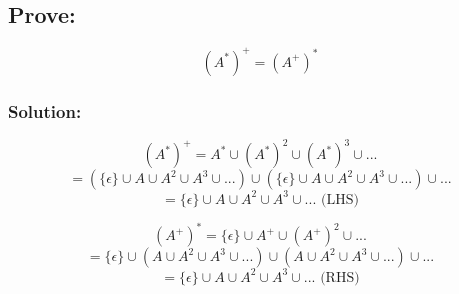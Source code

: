 \documentclass[12pt]{article}
\begin{document}
\subsection*{Prove:} 
\[
(A^*)^+=(A^+)^*
\]
\subsubsection*{Solution:}
\[(A^*)^+ = A^* \cup (A^*)^2 \cup (A^*)^3 \cup ... \]
\[= (\{\epsilon\} \cup A \cup A^2 \cup A^3 \cup ...) \cup (\{\epsilon\} \cup A \cup A^2 \cup A^3 \cup ...) \cup ...\]
\[= \{\epsilon\} \cup A \cup A^2 \cup A^3 \cup ...  \text{   (LHS)}\] 

\[(A^+)^* = \{\epsilon\} \cup A^+ \cup (A^+)^2 \cup ...\]
\[= \{\epsilon\} \cup (A \cup A^2 \cup A^3 \cup ...)\cup (A \cup A^2 \cup A^3 \cup ...)\cup ...\]
\[= \{\epsilon\} \cup A \cup A^2 \cup A^3 \cup ...  \text{   (RHS)}\] 
\end{document}
